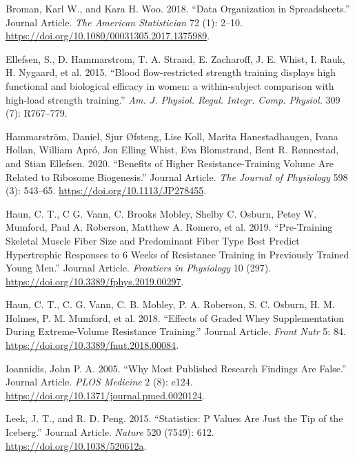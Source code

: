 \documentclass[
  11pt,
  letterpaper,
]{scrbook}
\newlength{\cslhangindent}
\newlength{\cslentryspacingunit} %
\newenvironment{CSLReferences}[2] %
 {%
  \setlength{\parindent}{0pt}
  \ifodd #1
  \let\oldpar\par
  \def\par{\hangindent=\cslhangindent\oldpar}
  \fi
  \setlength{\parskip}{#2\cslentryspacingunit}
 }%
 {}
\begin{document}
\hypertarget{refs}{}
\begin{CSLReferences}{1}{0}
\leavevmode{}%
Broman, Karl W., and Kara H. Woo. 2018. {``Data Organization in
Spreadsheets.''} Journal Article. \emph{The American Statistician} 72
(1): 2--10. \url{https://doi.org/10.1080/00031305.2017.1375989}.

\leavevmode{}%
Ellefsen, S., D. Hammarstrom, T. A. Strand, E. Zacharoff, J. E. Whist,
I. Rauk, H. Nygaard, et al. 2015. {``{Blood flow-restricted strength
training displays high functional and biological efficacy in women: a
within-subject comparison with high-load strength training}.''}
\emph{Am. J. Physiol. Regul. Integr. Comp. Physiol.} 309 (7): R767--779.

\leavevmode{}%
Hammarström, Daniel, Sjur Øfsteng, Lise Koll, Marita Hanestadhaugen,
Ivana Hollan, William Apró, Jon Elling Whist, Eva Blomstrand, Bent R.
Rønnestad, and Stian Ellefsen. 2020. {``Benefits of Higher
Resistance-Training Volume Are Related to Ribosome Biogenesis.''}
Journal Article. \emph{The Journal of Physiology} 598 (3): 543--65.
\url{https://doi.org/10.1113/JP278455}.

\leavevmode{}%
Haun, C. T., C G. Vann, C. Brooks Mobley, Shelby C. Osburn, Petey W.
Mumford, Paul A. Roberson, Matthew A. Romero, et al. 2019.
{``Pre-Training Skeletal Muscle Fiber Size and Predominant Fiber Type
Best Predict Hypertrophic Responses to 6 Weeks of Resistance Training in
Previously Trained Young Men.''} Journal Article. \emph{Frontiers in
Physiology} 10 (297). \url{https://doi.org/10.3389/fphys.2019.00297}.

\leavevmode{}%
Haun, C. T., C. G. Vann, C. B. Mobley, P. A. Roberson, S. C. Osburn, H.
M. Holmes, P. M. Mumford, et al. 2018. {``Effects of Graded Whey
Supplementation During Extreme-Volume Resistance Training.''} Journal
Article. \emph{Front Nutr} 5: 84.
\url{https://doi.org/10.3389/fnut.2018.00084}.

\leavevmode{}%
Ioannidis, John P. A. 2005. {``Why Most Published Research Findings Are
False.''} Journal Article. \emph{PLOS Medicine} 2 (8): e124.
\url{https://doi.org/10.1371/journal.pmed.0020124}.

\leavevmode{}%
Leek, J. T., and R. D. Peng. 2015. {``Statistics: P Values Are Just the
Tip of the Iceberg.''} Journal Article. \emph{Nature} 520 (7549): 612.
\url{https://doi.org/10.1038/520612a}.


\end{CSLReferences}
\end{document}
